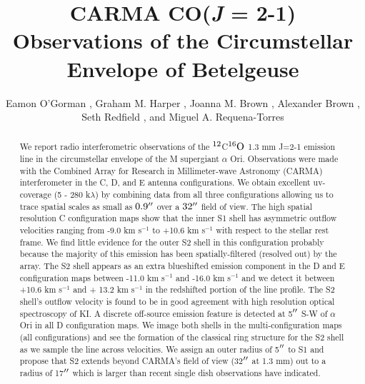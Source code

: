 \documentclass[iop]{emulateapj}
\begin{document}
\title{CARMA CO(\textit{J} = 2-1) Observations of the Circumstellar \\ Envelope of Betelgeuse}


\author{Eamon O'Gorman , Graham M. Harper  , Joanna M. Brown , Alexander Brown , Seth Redfield , and Miguel A. Requena-Torres  }


\begin{abstract}
We report radio interferometric observations of the $\rm{{}^{12}}$C$\rm{{}^{16}}O$ 1.3 mm J=2-1 emission line in the circumstellar envelope of the M supergiant $\alpha$ Ori.  Observations were made with the Combined Array for Research in Millimeter-wave Astronomy (CARMA) interferometer in the C, D, and E antenna configurations. We obtain excellent  uv-coverage (5 - 280 k$\lambda$) by combining data from all three configurations allowing us to trace spatial scales as small as $0.9\mbox{$^{\prime\prime}$}$ over a $32\mbox{$^{\prime\prime}$}$ field of view. The high spatial resolution C configuration maps show that the inner S1 shell has asymmetric outflow velocities ranging from -9.0 km s${}^{-1}$ to +10.6 km s${}^{-1}$ with respect to the stellar rest frame. We find little evidence  for the outer S2 shell in this configuration probably because the majority of this emission has been spatially-filtered (resolved out) by the array. The S2 shell appears as an extra blueshifted emission component in the D and E configuration maps between -11.0 km s${}^{-1}$  and -16.0 km s${}^{-1}$ and we detect it between +10.6 km s${}^{-1}$ and + 13.2 km s${}^{-1}$ in the redshifted portion of the line profile. The S2 shell's outflow velocity is found to be in good agreement with high resolution optical spectroscopy of KI. A discrete off-source emission feature is detected at 5$\mbox{$^{\prime\prime}$}$ S-W of  $\alpha$ Ori in all D configuration maps. We image both shells in the multi-configuration maps (all configurations) and see the formation of the classical ring structure for the S2 shell as we sample the line across velocities. We assign an outer radius of 5$\mbox{$^{\prime\prime}$}$ to S1 and propose that S2 extends beyond CARMA's field of view (32$\mbox{$^{\prime\prime}$}$ at 1.3 mm) out to a radius of 17$\mbox{$^{\prime\prime}$}$ which is larger than recent single dish observations have indicated. 
\end{abstract}
\end{document}
